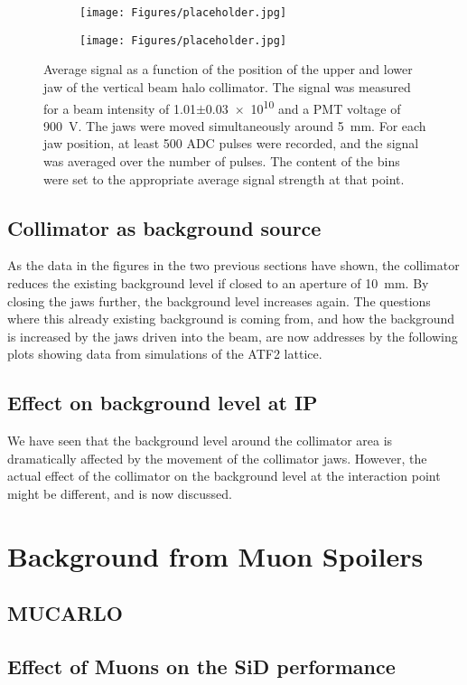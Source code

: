 \begin{figure}
\begin{subfigure}[b]{0.5\textwidth}
\texttt{[image: Figures/placeholder.jpg]}%
\end{subfigure}
\begin{subfigure}[b]{0.5\textwidth}
\texttt{[image: Figures/placeholder.jpg]}%
\end{subfigure}
\caption[RHUL Cherenkov detector signal for certain upper/lower jaw positions around \SI{5}{\milli\metre}, for a beam intensity of \num{1.01}$\pm$\num{0.03e10}]{Average signal as a function of the position of the upper and lower jaw of the vertical beam halo collimator. The signal was measured for a beam intensity of \num{1.01}$\pm$\num{0.03e10} and a PMT voltage of \SI{900}{\volt}. The jaws were moved simultaneously around \SI{5}{\milli\metre}. For each jaw position, at least 500 ADC pulses were recorded, and the signal was averaged over the number of pulses. The content of the bins were set to the appropriate average signal strength at that point.}
\label{fig:AverageSignal_Asymmetric_5mm_101}
\end{figure}
\subsection{Collimator as background source}
\label{sec:BDSIM_sim}
As the data in the figures in the two previous sections have shown, the collimator reduces the existing background level if closed to an aperture of \SI{10}{\milli\metre}. By closing the jaws further, the background level increases again. The questions where this already existing background is coming from, and how the background is increased by the jaws driven into the beam, are now addresses by the following plots showing data from \bdsim simulations of the ATF2 lattice.

\subsection{Effect on background level at IP}
\label{collimator_bkg_IP}
We have seen that the background level around the collimator area is dramatically affected by the movement of the collimator jaws. However, the actual effect of the collimator on the background level at the interaction point might be different, and is now discussed.

\section{Background from Muon Spoilers}
\subsection{MUCARLO}
\subsection{Effect of Muons on the SiD performance}